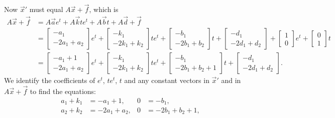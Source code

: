 \begin{exampleSol}
\begin{equation*}
\end{equation*}
Now ${\vec{x}}'$ must equal $A\vec{x} + \vec{f}$, which is
\begin{equation*}
\begin{split}
A \vec{x} + \vec{f} &=
A \vec{a}
e^{t}
+
A \vec{k}
t e^{t}
+
A \vec{b}
t
+
A \vec{d}
+ \vec{f}
\\
& =
\begin{bmatrix}
-a_1 \\ -2a_1+a_2
\end{bmatrix}
e^{t}
+
\begin{bmatrix}
-k_1 \\ -2k_1+k_2
\end{bmatrix}
t e^{t}
+
\begin{bmatrix}
-b_1 \\ -2b_1+b_2
\end{bmatrix}
t
+
\begin{bmatrix}
-d_1 \\ -2d_1+d_2
\end{bmatrix}
+
\begin{bmatrix}
1 \\ 0
\end{bmatrix} 
e^t
+
\begin{bmatrix}
0 \\ 1
\end{bmatrix} 
t 
\\
&=
\begin{bmatrix}
-a_1+1 \\ -2a_1+a_2
\end{bmatrix}
e^{t}
+
\begin{bmatrix}
-k_1 \\ -2k_1+k_2
\end{bmatrix}
t e^{t}
+
\begin{bmatrix}
-b_1 \\ -2b_1+b_2+1
\end{bmatrix}
t
+
\begin{bmatrix}
-d_1 \\ -2d_1+d_2
\end{bmatrix} .
\end{split}
\end{equation*}
We identify the coefficients of $e^t$, $te^t$, $t$ and any constant
vectors in $\vec{x}'$ and in $A\vec{x}+\vec{f}$ to find the equations:
\begin{align*}
a_1+k_1 & = -a_1+1 , &
0 & = -b_1 , \\
a_2+k_2 & = -2a_1+a_2 , &
0 & = -2b_1+b_2 + 1 , \\

\end{align*}
\end{exampleSol}
